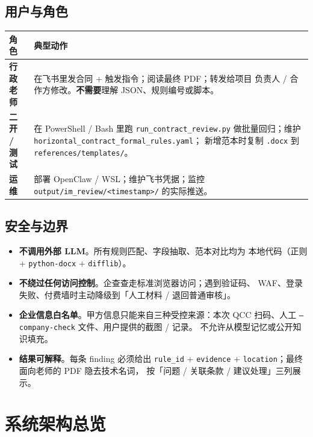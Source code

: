 \documentclass[11pt,a4paper]{article}
\begin{document}
\subsection{用户与角色}

\begin{longtable}{p{2.6cm} p{12.8cm}}
\toprule
\textbf{角色} & \textbf{典型动作} \\ \midrule
\endhead
\textbf{行政老师} & 在飞书里发合同 + 触发指令；阅读最终 PDF；转发给项目
负责人 / 合作方修改。\textbf{不需要}理解 JSON、规则编号或脚本。 \\
\textbf{二开 / 测试} & 在 PowerShell / Bash 里跑 \texttt{run\_contract\_review.py}
做批量回归；维护 \texttt{horizontal\_contract\_formal\_rules.yaml}；
新增范本时复制 \texttt{.docx} 到 \texttt{references/templates/}。 \\
\textbf{运维} & 部署 OpenClaw / WSL；维护飞书凭据；监控
\texttt{output/im\_review/<timestamp>/} 的实际推送。 \\
\bottomrule
\end{longtable}

\subsection{安全与边界}

\begin{itemize}[leftmargin=1.4em,itemsep=2pt]
  \item \textbf{不调用外部 LLM}。所有规则匹配、字段抽取、范本对比均为
    本地代码（正则 + \texttt{python-docx} + \texttt{difflib}）。
  \item \textbf{不绕过任何访问控制}。企查查走标准浏览器访问；遇到验证码、
    WAF、登录失败、付费墙时主动降级到「人工材料 / 退回普通审核」。
  \item \textbf{企业信息白名单}。甲方信息只能来自三种受控来源：本次 QCC
    扫码、人工 \texttt{--company-check} 文件、用户提供的截图 / 记录。
    不允许从模型记忆或公开知识填充。
  \item \textbf{结果可解释}。每条 finding 必须给出 \texttt{rule\_id} +
    \texttt{evidence} + \texttt{location}；最终面向老师的 PDF 隐去技术名词，
    按「问题 / 关联条款 / 建议处理」三列展示。
\end{itemize}

\section{系统架构总览}
\end{document}
